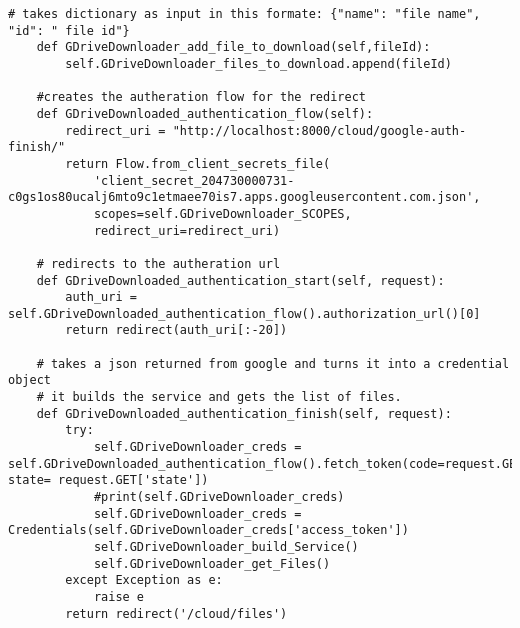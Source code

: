 \documentclass{article}
\begin{document}
\begin{verbatim}
# takes dictionary as input in this formate: {"name": "file name", "id": " file id"}
    def GDriveDownloader_add_file_to_download(self,fileId):
        self.GDriveDownloader_files_to_download.append(fileId)

    #creates the autheration flow for the redirect
    def GDriveDownloaded_authentication_flow(self):    
        redirect_uri = "http://localhost:8000/cloud/google-auth-finish/"
        return Flow.from_client_secrets_file(
            'client_secret_204730000731-c0gs1os80ucalj6mto9c1etmaee70is7.apps.googleusercontent.com.json',
            scopes=self.GDriveDownloader_SCOPES,
            redirect_uri=redirect_uri)

    # redirects to the autheration url
    def GDriveDownloaded_authentication_start(self, request):    
        auth_uri = self.GDriveDownloaded_authentication_flow().authorization_url()[0]
        return redirect(auth_uri[:-20])

    # takes a json returned from google and turns it into a credential object
    # it builds the service and gets the list of files. 
    def GDriveDownloaded_authentication_finish(self, request):    
        try:
            self.GDriveDownloader_creds = self.GDriveDownloaded_authentication_flow().fetch_token(code=request.GET['code'], state= request.GET['state'])
            #print(self.GDriveDownloader_creds)
            self.GDriveDownloader_creds = Credentials(self.GDriveDownloader_creds['access_token'])
            self.GDriveDownloader_build_Service()
            self.GDriveDownloader_get_Files()
        except Exception as e:
            raise e
        return redirect('/cloud/files')
\end{verbatim}
\end{document}
